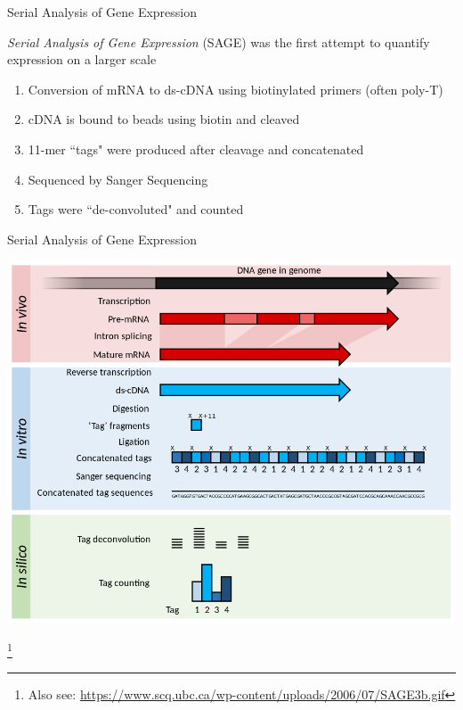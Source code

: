\documentclass[aspectratio=169,11pt]{beamer}
\newcommand\blfootnote[1]{%
  \begingroup
  \renewcommand\thefootnote{}\footnote{#1}%
  \addtocounter{footnote}{-1}%
  \endgroup
}
\begin{document}
\begin{frame}{Serial Analysis of Gene Expression}

\textit{Serial Analysis of Gene Expression} (SAGE) was the first attempt to quantify expression on a larger scale

	\begin{enumerate}
		\item Conversion of mRNA to ds-cDNA using biotinylated primers (often poly-T)
		\item cDNA is bound to beads using biotin and cleaved
		\item 11-mer ``tags" were produced after cleavage and concatenated
		\item Sequenced by Sanger Sequencing
		\item Tags were ``de-convoluted" and counted
	\end{enumerate}
%

\end{frame}

\begin{frame}{Serial Analysis of Gene Expression}

	\begin{center}
	\includegraphics[scale=0.25]{figures/SAGE.png} 
	\end{center}
	
	\blfootnote{Also see: \url{https://www.scq.ubc.ca/wp-content/uploads/2006/07/SAGE3b.gif}}

\end{frame}
\end{document}
